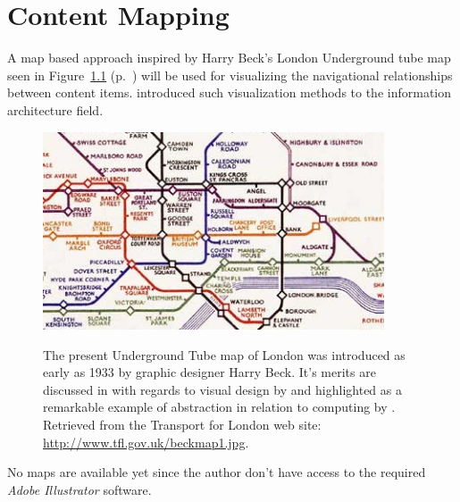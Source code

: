 \chapter{Content Mapping}

\label{appendix:content.mapping}

A map based approach inspired by Harry Beck's London Underground tube
map seen in Figure~\ref{figure:beck.1933.map}
(p.~\pageref{figure:beck.1933.map})
will be used for visualizing the navigational relationships between content
items. \citet{walsh07} introduced such visualization methods to the information
architecture field.

\begin{figure}[h]
  \begin{center}
    \label{figure:beck.1933.map}
    \includegraphics[width=0.9\textwidth]{beck_1933_map}
    \caption[1933 London Underground Tube map]{%
      The present Underground Tube map of London was introduced as early as
      1933 by graphic designer Harry Beck. It's merits are discussed
      in with regards to visual design by \citet{hadlaw03} and highlighted as
      a remarkable example of abstraction in relation to computing by
      \citet{kramer07}. Retrieved from the Transport for London web site:
      \url{http://www.tfl.gov.uk/beckmap1.jpg}.}
  \end{center}
\end{figure}

No maps are available yet since the author don't have access to the required
\emph{Adobe Illustrator} software.
